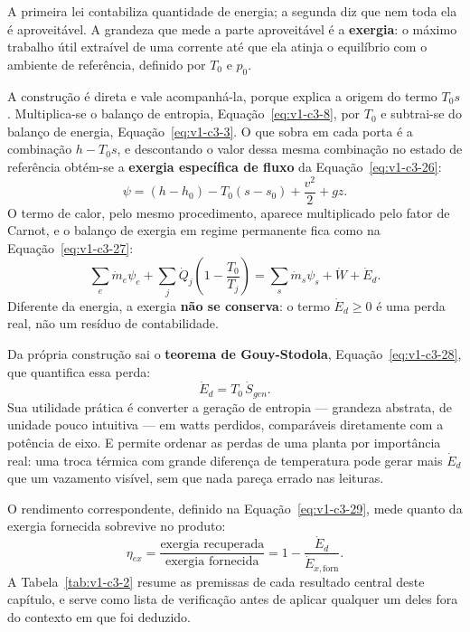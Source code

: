 \documentclass[12pt,a4paper]{article}
\numberwithin{equation}{section}
\numberwithin{table}{section}
\numberwithin{figure}{section}
\begin{document}
A primeira lei contabiliza quantidade de energia; a segunda diz que nem toda
ela é aproveitável. A grandeza que mede a parte aproveitável é a
\textbf{exergia}: o máximo trabalho útil extraível de uma corrente até que ela
atinja o equilíbrio com o ambiente de referência, definido por $T_0$ e $p_0$.

A construção é direta e vale acompanhá-la, porque explica a origem do termo
$T_0 s$. Multiplica-se o balanço de entropia,
Equação~\eqref{eq:v1-c3-8}, por $T_0$ e subtrai-se do balanço de energia,
Equação~\eqref{eq:v1-c3-3}. O que sobra em cada porta é a combinação
$h - T_0 s$, e descontando o valor dessa mesma combinação no estado de
referência obtém-se a \textbf{exergia específica de fluxo} da
Equação~\eqref{eq:v1-c3-26}:
\begin{equation}\label{eq:v1-c3-26}
\psi = (h - h_0) - T_0 (s - s_0) + \frac{v^2}{2} + g z .
\end{equation}
O termo de calor, pelo mesmo procedimento, aparece multiplicado pelo fator de
Carnot, e o balanço de exergia em regime permanente fica como na
Equação~\eqref{eq:v1-c3-27}:
\begin{equation}\label{eq:v1-c3-27}
\sum_e \dot{m}_e \psi_e +
\sum_j \dot{Q}_j\!\left(1 - \frac{T_0}{T_j}\right) =
\sum_s \dot{m}_s \psi_s + \dot{W} + \dot{E}_d .
\end{equation}
Diferente da energia, a exergia \textbf{não se conserva}: o termo
$\dot{E}_d \ge 0$ é uma perda real, não um resíduo de contabilidade.

Da própria construção sai o \textbf{teorema de Gouy-Stodola},
Equação~\eqref{eq:v1-c3-28}, que quantifica essa perda:
\begin{equation}\label{eq:v1-c3-28}
\dot{E}_d = T_0 \, \dot{S}_{gen} .
\end{equation}
Sua utilidade prática é converter a geração de entropia --- grandeza abstrata,
de unidade pouco intuitiva --- em watts perdidos, comparáveis diretamente com a
potência de eixo. E permite ordenar as perdas de uma planta por importância
real: uma troca térmica com grande diferença de temperatura pode gerar mais
$\dot{E}_d$ que um vazamento visível, sem que nada pareça errado nas leituras.

O rendimento correspondente, definido na Equação~\eqref{eq:v1-c3-29}, mede
quanto da exergia fornecida sobrevive no produto:
\begin{equation}\label{eq:v1-c3-29}
\eta_{ex} = \frac{\text{exergia recuperada}}{\text{exergia fornecida}}
= 1 - \frac{\dot{E}_d}{\dot{E}_{x,\text{forn}}} .
\end{equation}
A Tabela~\ref{tab:v1-c3-2} resume as premissas de cada resultado central deste
capítulo, e serve como lista de verificação antes de aplicar qualquer um deles
fora do contexto em que foi deduzido.
\end{document}
